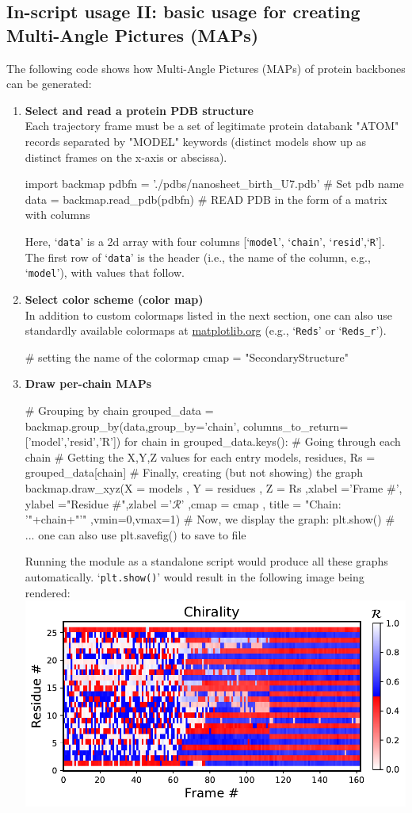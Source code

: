 \documentclass[fleqn,10pt,lineno]{wlpeerj} %
\def\ContinueLineNumber{\lstset{firstnumber=last}}
\newcommand{\code}[1]{\texttt{#1}\xspace}
\begin{document}
\subsection*{In-script usage II: basic usage for creating Multi-Angle Pictures (MAPs)}
The following code shows how Multi-Angle Pictures (MAPs) of protein backbones can be generated:
\begin{enumerate}
\item {\bf Select and read a protein PDB structure}\\
Each trajectory frame must be a set of legitimate protein databank "ATOM" records separated by "MODEL" keywords (distinct models show up as distinct frames on the x-axis or abscissa).
\begin{python}[firstnumber=1]
import backmap 
pdbfn = './pdbs/nanosheet_birth_U7.pdb' # Set pdb name 
data = backmap.read_pdb(pdbfn) # READ PDB in the form of a matrix with columns
\end{python}
Here, `\code{data}' is a 2d array with four columns [`\code{model}', `\code{chain}', `\code{resid}',`\code{R}']. 
The first row of `\code{data}' is the header (i.e., the name of the column, e.g., `\code{model}'), 
with values that follow.
\item {\bf Select color scheme (color map)}\\
In addition to custom colormaps listed in the next section, one can also use standardly available colormaps at 
\href{http://matplotlib.org/examples/color/colormaps_reference.htm}{matplotlib.org} (e.g., `\code{Reds}' or `\code{Reds\_r}').
\ContinueLineNumber
\begin{python}
# setting the name of the colormap
cmap = "SecondaryStructure"
\end{python}
\item {\bf Draw per-chain MAPs}
\ContinueLineNumber
\begin{python}
# Grouping by chain
grouped_data = backmap.group_by(data,group_by='chain',
                            columns_to_return=['model','resid','R'])
for chain in grouped_data.keys(): # Going through each chain
	# Getting the X,Y,Z values for each entry
	models, residues, Rs = grouped_data[chain]
	# Finally, creating (but not showing) the graph 
	backmap.draw_xyz(X = models  ,      Y = residues  ,     Z = Rs
	           ,xlabel ='Frame #', ylabel ="Residue #",zlabel ='$\mathcal{R}$'
	             ,cmap = cmap    ,  title = "Chain: '"+chain+"'"
	             ,vmin=0,vmax=1)
	# Now, we display the graph:
	plt.show() # ... one can also use plt.savefig() to save to file
\end{python}
Running the module as a standalone script would produce all these graphs automatically.
`\code{plt.show()}' would result in the following image being rendered:\\
\includegraphics[width=0.5\linewidth]{automated_figures/example.pdf}


\end{enumerate}
\end{document}
